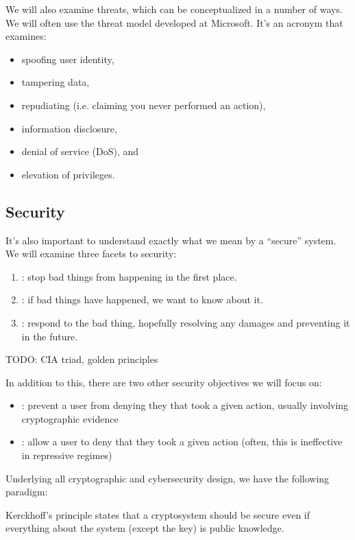 We will also examine threats, which can be conceptualized in a number of ways. We will often use the  threat model developed at Microsoft. It's an acronym that examines:

\begin{itemize}[noitemsep]
    \item spoofing user identity,
    \item tampering data,
    \item repudiating (i.e. claiming you never performed an action),
    \item information disclosure,
    \item denial of service (DoS), and
    \item elevation of privileges.
\end{itemize}

\subsection{Security}
It's also important to understand exactly what we mean by a ``secure'' system. We will examine three facets to security:

\begin{enumerate}
    \item {}: stop bad things from happening in the first place.
    \item {}: if bad things have happened, we want to know about it.
    \item {}: respond to the bad thing, hopefully resolving any damages and preventing it in the future.
\end{enumerate}

TODO: CIA triad, golden principles

In addition to this, there are two other security objectives we will focus on:
\begin{itemize}
    \item {}: prevent a user from denying they that took a given action, usually involving cryptographic evidence
    \item {}: allow a user to deny that they took a given action (often, this is ineffective in repressive regimes)
\end{itemize}

Underlying all cryptographic and cybersecurity design, we have the following paradigm:

\begin{dfnbox}{Kerckhoff's principle}{}
     states that a cryptosystem should be secure even if everything about the system (except the key) is public knowledge.
\end{dfnbox}

